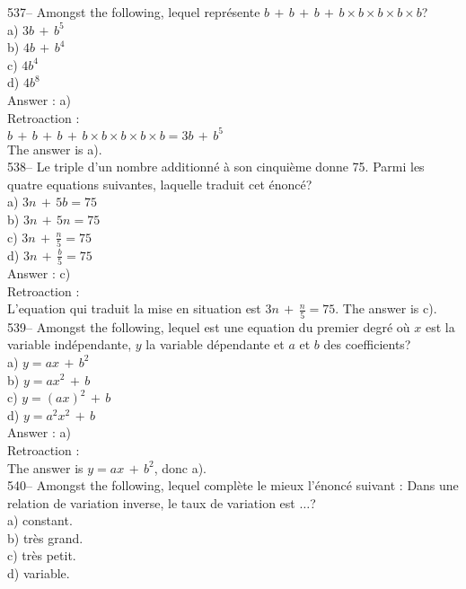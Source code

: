 ﻿\documentclass[letterpaper, 12pt]{article}
\begin{document}
537-- Amongst the following, lequel repr\'esente
$b\,+\,b\,+\,b\,+\,b\times b\times b \times b \times b$?\\
a) $3b\,+\,b^{5}$\\
b) $4b\,+\,b^{4}$\\
c) $4b^{4}$\\
d) $4b^{8}$\\


Answer : a)\\

Retroaction : \\
$b\,+\,b\,+\,b\,+\,b\times b\times b \times b \times b= 3b\,+\,b^{5}$\\
The answer is a).\\

538-- Le triple d'un nombre additionn\'e \`a son cinqui\`eme donne 75.
Parmi les quatre equations suivantes, laquelle traduit cet \'enonc\'e?\\
a) $3n\,+\,5b=75$\\[2mm]
b) $3n\,+\,5n=75$\\[2mm]
c) $3n\,+\,\frac{n}{5}=75$\\[2mm]
d) $3n\,+\,\frac{b}{5}=75$\\

Answer : c)\\

Retroaction : \\
L'equation qui traduit la mise en situation est $3n\,+\,\frac{n}{5}=75$.
The answer is c).\\


539-- Amongst the following, lequel est une equation du premier
degr\'e o\`u $x$ est la variable ind\'ependante, $y$ la variable
d\'ependante et $a$ et $b$ des coefficients?\\
a) $y=ax\,+\,b^{2}$ \\
b) $y=ax^{2}\,+\,b$\\
c) $y=\left( ax\right) ^{2}\,+\,b$\\
d) $y=a^{2}x^{2}\,+\,b$\\

Answer : a)\\

Retroaction : \\
The answer is $y=ax\,+\,b^{2}$, donc a). \\

540-- Amongst the following, lequel compl\`ete le mieux
l'\'enonc\'e suivant : \og Dans une relation de variation inverse,
le taux de variation est $\ldots$\fg ?\\
a) constant.\\
b) tr\`es grand.\\
c) tr\`es petit.\\
d) variable.\\
\end{document}
